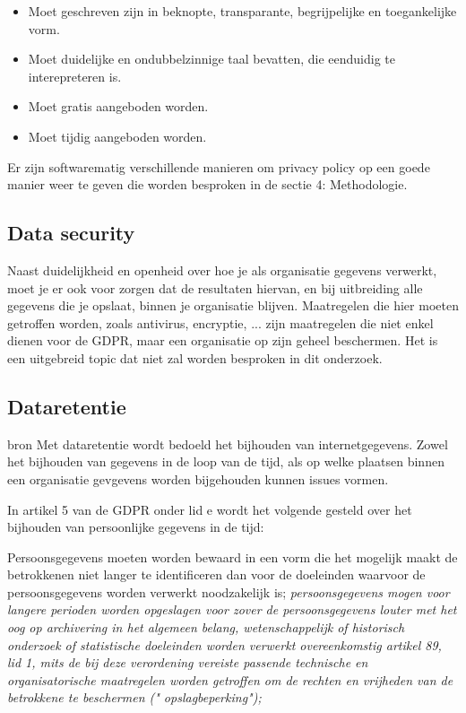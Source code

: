 \begin{itemize}
	\item Moet geschreven zijn in beknopte, transparante, begrijpelijke en toegankelijke vorm.
	\item Moet duidelijke en ondubbelzinnige taal bevatten, die eenduidig te interepreteren is. 
	\item Moet gratis aangeboden worden.
	\item Moet tijdig aangeboden worden.
\end{itemize}

Er zijn softwarematig verschillende manieren om privacy policy op een goede manier weer te geven die worden besproken in de sectie 4: Methodologie. 

\subsection{Data security}
Naast duidelijkheid en openheid over hoe je als organisatie gegevens verwerkt, moet je er ook voor zorgen dat de resultaten hiervan, en bij uitbreiding alle gegevens die je opslaat, binnen je organisatie blijven.
Maatregelen die hier moeten getroffen worden, zoals antivirus, encryptie, ... zijn maatregelen die niet enkel dienen voor de GDPR, maar een organisatie op zijn geheel beschermen. 
Het is een uitgebreid topic dat niet zal worden besproken in dit onderzoek. 


\subsection{Dataretentie}
bron %
Met dataretentie wordt bedoeld het bijhouden van internetgegevens. Zowel het bijhouden van gegevens in de loop van de tijd, als op welke plaatsen binnen een organisatie gevgevens worden bijgehouden kunnen issues vormen. 

In artikel 5 van de GDPR onder lid e wordt het volgende gesteld over het bijhouden van persoonlijke gegevens in de tijd:

Persoonsgegevens moeten worden bewaard in een vorm die het mogelijk maakt de betrokkenen niet langer te identificeren dan voor de doeleinden waarvoor de persoonsgegevens worden verwerkt noodzakelijk is; \textit{persoonsgegevens mogen voor langere perioden worden opgeslagen voor zover de persoonsgegevens louter met het oog op archivering in het algemeen belang, wetenschappelijk of historisch onderzoek of statistische doeleinden worden verwerkt overeenkomstig artikel 89, lid 1, mits de bij deze verordening vereiste passende technische en organisatorische maatregelen worden getroffen om de rechten en vrijheden van de betrokkene te beschermen (" opslagbeperking");}

